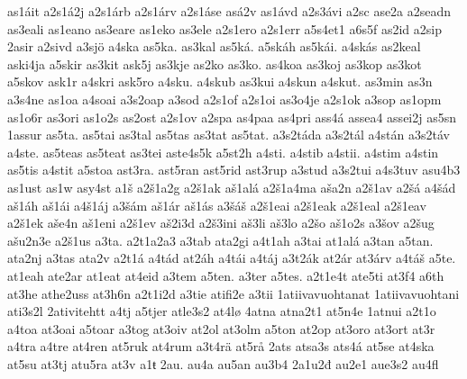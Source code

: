 {    as1áit
    a2s1á2j
    a2s1árb
    a2s1árv
    a2s1áse
    asá2v
    as1ávd
    a2s3ávi
    a2sc
    ase2a
    a2seadn
    as3eali
    as1eano
    as3eare
    as1eko
    as3ele
    a2s1ero
    a2s1err
    a5s4et1
    a6s5f
    as2id
    a2sip
    2asir
    a2sivd
    a3sjö
    a4ska
    as5ka.
    as3kal
    as5ká.
    a5skáh
    as5kái.
    a4skás
    as2keal
    aski4ja
    a5skir
    as3kit
    ask5j
    as3kje
    as2ko
    as3ko.
    as4koa
    as3koj
    as3kop
    as3kot
    a5skov
    ask1r
    a4skri
    ask5ro
    a4sku.
    a4skub
    as3kui
    a4skun
    a4skut.
    as3min
    as3n
    a3s4ne
    as1oa
    a4soai
    a3s2oap
    a3sod
    a2s1of
    a2s1oi
    as3o4je
    a2s1ok
    a3sop
    as1opm
    as1o6r
    as3ori
    as1o2s
    as2ost
    a2s1ov
    a2spa
    as4paa
    as4pri
    ass4á
    assea4
    assei2j
    as5sn
    1assur
    as5ta.
    as5tai
    as3tal
    as5tas
    as3tat
    as5tat.
    a3s2táda
    a3s2tál
    a4stán
    a3s2táv
    a4ste.
    as5teas
    as5teat
    as3tei
    aste4s5k
    a5st2h
    a4sti.
    a4stib
    a4stii.
    a4stim
    a4stin
    as5tis
    a4stit
    a5stoa
    ast3ra.
    ast5ran
    ast5rid
    ast3rup
    a3stud
    a3s2tui
    a4s3tuv
    asu4b3
    as1ust
    as1w
    asy4st
    a1š
    a2š1a2g
    a2š1ak
    aš1alá
    a2š1a4ma
    aša2n
    a2š1av
    a2šá
    a4šád
    aš1áh
    aš1ái
    a4š1áj
    a3šám
    aš1ár
    aš1ás
    a3šáš
    a2š1eai
    a2š1eak
    a2š1eal
    a2š1eav
    a2š1ek
    aše4n
    aš1eni
    a2š1ev
    aš2i3d
    a2š3ini
    aš3li
    aš3lo
    a2šo
    aš1o2s
    a3šov
    a2šug
    ašu2n3e
    a2š1us
    a3ta.
    a2t1a2a3
    a3tab
    ata2gi
    a4t1ah
    a3tai
    at1alá
    a3tan
    a5tan.
    ata2nj
    a3tas
    ata2v
    a2t1á
    a4tád
    at2áh
    a4tái
    a4táj
    a3t2ák
    at2ár
    at3árv
    a4táš
    a5te.
    at1eah
    ate2ar
    at1eat
    at4eid
    a3tem
    a5ten.
    a3ter
    a5tes.
    a2t1e4t
    ate5ti
    at3f4
    a6th
    at3he
    athe2uss
    at3h6n
    a2t1i2d
    a3tie
    atifi2e
    a3tii
    1atiivavuohtanat
    1atiivavuohtani
    ati3s2l
    2ativitehtt
    a4tj
    a5tjer
    atle3s2
    at4lø
    4atna
    atna2t1
    at5n4e
    1atnui
    a2t1o
    a4toa
    at3oai
    a5toar
    a3tog
    at3oiv
    at2ol
    at3olm
    a5ton
    at2op
    at3oro
    at3ort
    at3r
    a4tra
    a4tre
    at4ren
    at5ruk
    at4rum
    a3t4rä
    at5rå
    2ats
    atsa3s
    ats4á
    at5se
    at4ska
    at5su
    at3tj
    atu5ra
    at3v
    a1ŧ
    2au.
    au4a
    au5an
    au3b4
    2a1u2đ
    au2e1
    aue3s2
    au4fl
}

